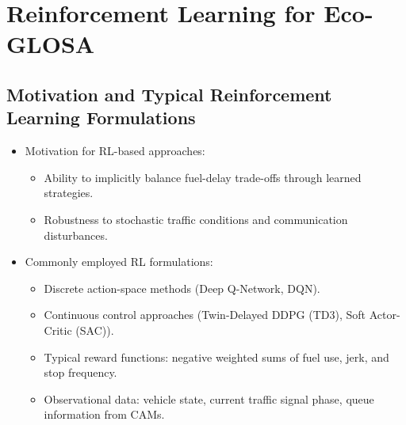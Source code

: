 \section{Reinforcement Learning for Eco-GLOSA}
\label{sec:rl_eco_glosa}

\subsection{Motivation and Typical Reinforcement Learning Formulations}
\label{subsec:rl_motivation_formulation}
\begin{itemize}
    \item Motivation for RL-based approaches:
    \begin{itemize}
        \item Ability to implicitly balance fuel-delay trade-offs through learned strategies.
        \item Robustness to stochastic traffic conditions and communication disturbances.
    \end{itemize}
    \item Commonly employed RL formulations:
    \begin{itemize}
        \item Discrete action-space methods (Deep Q-Network, DQN).
        \item Continuous control approaches (Twin-Delayed DDPG (TD3), Soft Actor-Critic (SAC)).
        \item Typical reward functions: negative weighted sums of fuel use, jerk, and stop frequency.
        \item Observational data: vehicle state, current traffic signal phase, queue information from CAMs.
    \end{itemize}
\end{itemize}

